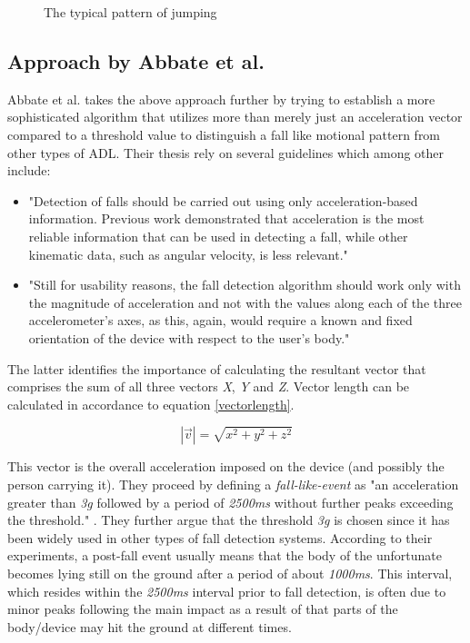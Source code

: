 \documentclass[12pt, a4paper, onecolumn]{article}
\begin{document}
	\begin{figure}[H]
		\centering
		\caption{The typical pattern of jumping}%
		\label{fig:Pattern-Jumping}%
	\end{figure}
	
	\subsection{Approach by Abbate et al.}
	Abbate et al. takes the above approach further by trying to establish a more sophisticated algorithm that utilizes more than merely just an acceleration vector compared to a threshold value to distinguish a fall like motional pattern from other types of ADL. Their thesis rely on several guidelines which among other include: 
	\begin{itemize} 
		\item "Detection of falls should be carried out using only acceleration-based information. Previous work demonstrated that acceleration is the most reliable information that can be used in detecting a fall, while other kinematic data, such as angular velocity, is less relevant." \cite[p~3]{piza_uni}
		
		\item "Still for usability reasons, the fall detection algorithm should work only with the magnitude of acceleration and not with the values along each of the three accelerometer’s axes, as this, again, would require a known and fixed orientation of the device with respect to the user’s body." \cite[p~3]{piza_uni}
	\end{itemize}
	
	The latter identifies the importance of calculating the resultant vector that comprises the sum of all three vectors \textit{X}, \textit{Y} and \textit{Z}. Vector length can be calculated in accordance to equation \ref{vectorlength}.
	
	\begin{equation}
	\label{vectorlength}
	|\vec{v}|=\sqrt{x^2+y^2+z^2}
	\end{equation}
	
	This vector is the overall acceleration imposed on the device (and possibly the person carrying it). They proceed by defining a \textit{fall-like-event} as "an acceleration greater than \textit{3g} followed by a period of \textit{2500ms} without further peaks exceeding the threshold." \cite[p~5]{piza_uni}. They further argue that the threshold \textit{3g} is chosen since it has been widely used in other types of fall detection systems. According to their experiments, a post-fall event usually means that the body of the unfortunate becomes lying still on the ground after a period of about \textit{1000ms}. This interval, which resides within the \textit{2500ms} interval prior to fall detection, is often due to minor peaks following the main impact as a result of that parts of the body/device may hit the ground at different times. 
	
\end{document}
